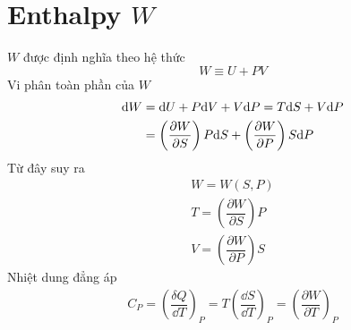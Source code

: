 \section{Enthalpy $ W $}
	$ W $ được định nghĩa theo hệ thức
	\begin{equation}\label{eq:3.12}
		W \equiv U + PV
	\end{equation}
	Vi phân toàn phần của $ W $
	\begin{align}\label{eq:3.13}
		\mathrm{d}W 
		& = \mathrm{d}U + P\mathrm{d}V + V\mathrm{d}P 
		= T\mathrm{d}S + V\mathrm{d}P \notag \\
		& = \left(\dfrac{\partial W}{\partial S}\right)P\mathrm{d}S + \left(\dfrac{\partial W}{\partial P}\right)S\mathrm{d}P
	\end{align}
	Từ đây suy ra
	\begin{align}
		W = W\left(S,P\right) \\
		T = \left(\dfrac{\partial W}{\partial S}\right)P \\
		V = \left(\dfrac{\partial W}{\partial P}\right)S
	\end{align}
	Nhiệt dung đẳng áp
	\begin{align}\label{eq:3.17}
		C_P 
		= \left(\dfrac{\delta Q}{\dd{T}}\right)_P 
		= T \left(\dfrac{\dd{S}}{\dd{T}}\right)_P 
		= \left(\dfrac{\partial W}{\partial T}\right)_P
	\end{align}